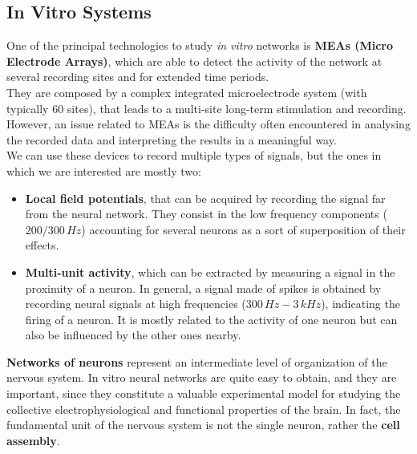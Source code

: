 \subsection{In Vitro Systems}
One of the principal technologies to study \textit{in vitro} networks is 
\textbf{MEAs (Micro Electrode Arrays)}, which are able to detect the 
activity of the network at several recording sites and for extended time 
periods.\\
They are composed by a complex integrated microelectrode system (with 
typically 60 sites), that leads to a multi-site long-term stimulation and 
recording.
However, an issue related to MEAs is the difficulty often encountered in 
analysing the recorded data
and interpreting the results in a meaningful way.\\
We can use these devices to record multiple types of signals, but the ones 
in which we are interested are mostly two:
\begin{itemize}
    \item \textbf{Local field potentials}, that can be acquired by 
recording the signal far from the neural network. They consist in the low 
frequency components (\(200/300\,Hz\)) accounting for several neurons as a sort 
of superposition of their effects.
    \item \textbf{Multi-unit activity}, which can be extracted by 
measuring a signal in the proximity of a neuron.  In general, a signal made 
of spikes is obtained by recording neural signals at high frequencies
(\(300\,Hz-3\,kHz\)), indicating the firing of a neuron. It is mostly related to the 
activity of one neuron but can also be influenced by the other ones 
nearby.
\end{itemize}

\textbf{Networks of neurons} represent an intermediate level of 
organization of the nervous system. 
In vitro neural networks are quite easy to obtain, and they are important, 
since they constitute a valuable experimental model for studying the 
collective electrophysiological and functional properties of the brain. In 
fact, the fundamental unit of the nervous system is not the single neuron,
rather the \textbf{cell assembly}.\\

